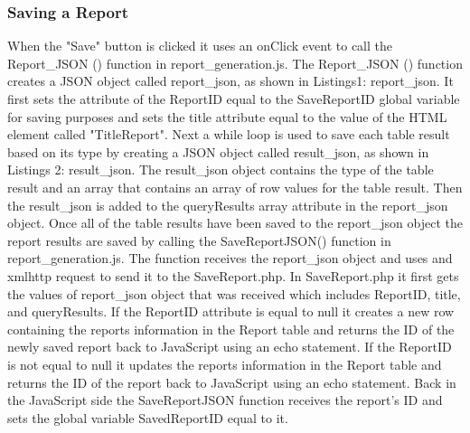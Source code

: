 \documentclass[../final.tex]{subfiles}
\begin{document}
	\subsubsection{Saving a Report}
	When the "Save" button is clicked it uses an onClick event to call the Report\_JSON () function in report\_generation.js. The Report\_JSON () function creates a JSON object called report\_json, as shown in Listings1: report\_json. It first sets the attribute of the ReportID equal to the SaveReportID global variable for saving purposes and sets the title attribute equal to the value of the HTML element called "TitleReport". Next a while loop is used to save each table result based on its type by creating a JSON object called result\_json, as shown in Listings 2: result\_json. The result\_json object contains the type of the table result and an array that contains an array of row values for the table result. Then the result\_json is added to the queryResults array attribute in the report\_json object. Once all of the table results have been saved to the report\_json object the report results are saved by calling the SaveReportJSON() function in report\_generation.js. The function receives the report\_json object and uses and xmlhttp request to send it to the SaveReport.php. In SaveReport.php it first gets the values of report\_json object that was received which includes ReportID, title, and queryResults. If the ReportID attribute is equal to null it creates a new row containing the reports information in the Report table and returns the ID of the newly saved report back to JavaScript using an echo statement. If the ReportID is not equal to null it updates the reports information in the Report table and returns the ID of the report back to JavaScript using an echo statement. Back in the JavaScript side the SaveReportJSON function receives the report's ID and sets the global variable SavedReportID equal to it. 
	
\end{document}

